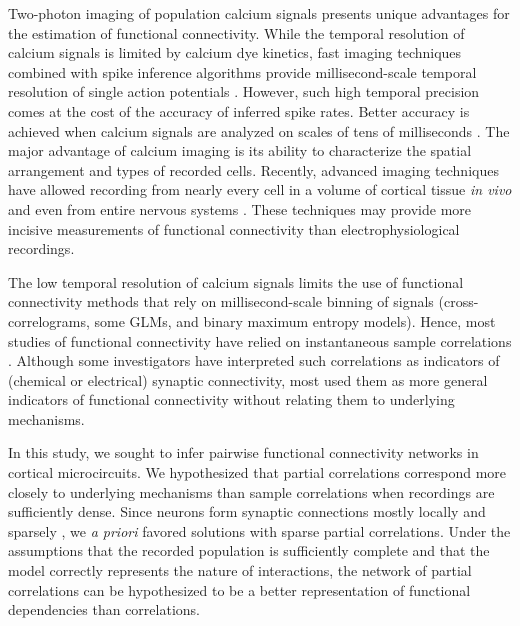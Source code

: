 Two-photon imaging of population calcium signals presents unique advantages for the estimation of functional connectivity.  While the temporal resolution of calcium signals is limited by calcium dye kinetics, fast imaging techniques combined with spike inference algorithms provide millisecond-scale temporal resolution of single action potentials \cite{Grewe:2010}. However, such high temporal precision comes at the cost of the accuracy of inferred spike rates.  Better accuracy is achieved when calcium signals are analyzed on scales of tens of milliseconds \cite{Cotton:2013}.  The major advantage of calcium imaging is its ability to characterize the spatial arrangement and types of recorded cells.  Recently, advanced imaging techniques have allowed recording from nearly every cell in a volume of cortical tissue  \emph{in vivo} \cite{Katona:2012, Cotton:2013} and even from entire nervous systems \cite{Leung:2013, Ahrens:2013}.  These techniques may provide more incisive measurements of functional connectivity than electrophysiological recordings.

The low temporal resolution of calcium signals limits the use of functional connectivity methods that rely on millisecond-scale binning of signals (cross-correlograms, some GLMs, and binary maximum entropy models).  Hence, most studies of functional connectivity have relied on instantaneous sample correlations \cite{Greenberg:2008, Golshani:2009, Hofer:2011, Malmersjo:2013} .  Although some investigators have interpreted such correlations as indicators of (chemical or electrical) synaptic connectivity, most used them as more general indicators of functional connectivity without relating them to underlying mechanisms.

In this study, we sought to infer pairwise functional connectivity networks  in cortical microcircuits. We hypothesized that partial correlations correspond more closely to underlying mechanisms than sample correlations when recordings are sufficiently dense.  Since neurons form synaptic connections mostly locally and sparsely \cite{Perin:2011}, we \emph{a priori} favored solutions with sparse partial correlations.  Under the assumptions that the recorded population is sufficiently complete and that the model correctly represents the nature of interactions, the network of partial correlations can be hypothesized to be a better representation of functional dependencies than correlations.

